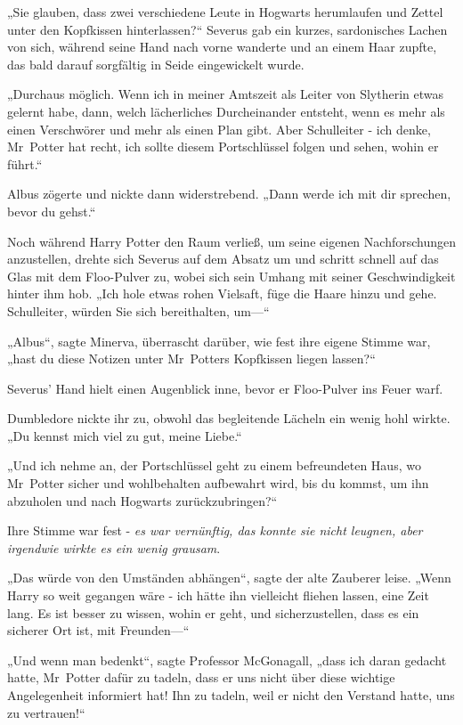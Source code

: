 {„Sie glauben, dass zwei verschiedene Leute in Hogwarts herumlaufen und Zettel unter den Kopfkissen hinterlassen?“ Severus gab ein kurzes, sardonisches Lachen von sich, während seine Hand nach vorne wanderte und an einem Haar zupfte, das bald darauf sorgfältig in Seide eingewickelt wurde.

„Durchaus möglich. Wenn ich in meiner Amtszeit als Leiter von Slytherin etwas gelernt habe, dann, welch lächerliches Durcheinander entsteht, wenn es mehr als einen Verschwörer und mehr als einen Plan gibt. Aber Schulleiter - ich denke, Mr~Potter hat recht, ich sollte diesem Portschlüssel folgen und sehen, wohin er führt.“

Albus zögerte und nickte dann widerstrebend. „Dann werde ich mit dir sprechen, bevor du gehst.“

Noch während Harry Potter den Raum verließ, um seine eigenen Nachforschungen anzustellen, drehte sich Severus auf dem Absatz um und schritt schnell auf das Glas mit dem Floo-Pulver zu, wobei sich sein Umhang mit seiner Geschwindigkeit hinter ihm hob. „Ich hole etwas rohen Vielsaft, füge die Haare hinzu und gehe. Schulleiter, würden Sie sich bereithalten, um—“

„Albus“, sagte Minerva, überrascht darüber, wie fest ihre eigene Stimme war, „hast du diese Notizen unter Mr~Potters Kopfkissen liegen lassen?“

Severus' Hand hielt einen Augenblick inne, bevor er Floo-Pulver ins Feuer warf.

Dumbledore nickte ihr zu, obwohl das begleitende Lächeln ein wenig hohl wirkte. „Du kennst mich viel zu gut, meine Liebe.“

„Und ich nehme an, der Portschlüssel geht zu einem befreundeten Haus, wo Mr~Potter sicher und wohlbehalten aufbewahrt wird, bis du kommst, um ihn abzuholen und nach Hogwarts zurückzubringen?“

Ihre Stimme war fest - \emph{es war vernünftig, das konnte sie nicht leugnen, aber irgendwie wirkte es ein wenig grausam}.

„Das würde von den Umständen abhängen“, sagte der alte Zauberer leise. „Wenn Harry so weit gegangen wäre - ich hätte ihn vielleicht fliehen lassen, eine Zeit lang. Es ist besser zu wissen, wohin er geht, und sicherzustellen, dass es ein sicherer Ort ist, mit Freunden—“

„Und wenn man bedenkt“, sagte Professor McGonagall, „dass ich daran gedacht hatte, Mr~Potter dafür zu tadeln, dass er uns nicht über diese wichtige Angelegenheit informiert hat! Ihn zu tadeln, weil er nicht den Verstand hatte, uns zu vertrauen!“

}
